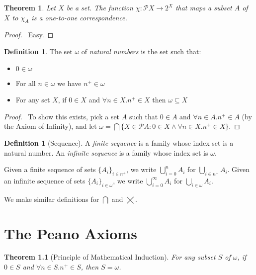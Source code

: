 \documentclass{report}
\let\qed\relax
\newtheorem{thm}[ax]{Theorem}
\theoremstyle{definition}
\newtheorem{df}[ax]{Definition}
\begin{document}
\begin{thm}
Let $X$ be a set. The function $\chi : \mathcal{P} X \rightarrow 2^X$ that maps a subset $A$ of $X$ to $\chi_A$ is a one-to-one correspondence.
\end{thm}

\begin{proof}
\pf\ Easy. \qed
\end{proof}

\begin{df}
The set $\omega$ of \emph{natural numbers} is the set such that:
\begin{itemize}
\item $0 \in \omega$
\item For all $n \in \omega$ we have $n^+ \in \omega$
\item For any set $X$, if $0 \in X$ and $\forall n \in X. n^+ \in X$ then $\omega \subseteq X$
\end{itemize}
\end{df}

\begin{proof}
\pf\ To show this exists, pick a set $A$ such that $0 \in A$ and $\forall n \in A. n^+ \in A$ (by the Axiom of Infinity), and let $\omega = \bigcap \{ X \in \mathcal{P} A : 0 \in X \wedge \forall n \in X. n^+ \in X \}$. \qed
\end{proof}

\begin{df}[Sequence]
A \emph{finite sequence} is a family whose index set is a natural number. An \emph{infinite sequence} is a family whose index set is $\omega$.

Given a finite sequence of sets $\{ A_i \}_{i \in n^+}$, we write $\bigcup_{i=0}^n A_i$ for $\bigcup_{i \in n^+} A_i$. Given an infinite sequence of sets $\{ A_i \}_{i \in \omega}$, we write $\bigcup_{i=0}^\infty A_i$ for $\bigcup_{i \in \omega} A_i$.

We make similar definitions for $\bigcap$ and $\bigtimes$.
\end{df}

\chapter{The Peano Axioms}

\begin{thm}[Principle of Mathematical Induction]
For any subset $S$ of $\omega$, if $0 \in S$ and $\forall n \in S. n^+ \in S$, then $S = \omega$.
\end{thm}
\end{document}
